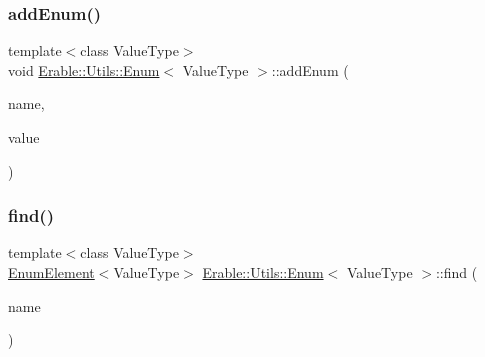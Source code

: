 \mbox{\label{class_erable_1_1_utils_1_1_enum_a8ffb9f7e0977ecf7ae1dae1c9bf02cfb}} 
\subsubsection{\texorpdfstring{addEnum()}{addEnum()}\hspace{0.1cm}{\footnotesize\ttfamily [2/2]}}
{\footnotesize\ttfamily template$<$class Value\+Type$>$ \\
void \mbox{\hyperlink{class_erable_1_1_utils_1_1_enum}{Erable\+::\+Utils\+::\+Enum}}$<$ Value\+Type $>$\+::add\+Enum (\begin{DoxyParamCaption}\item[{const std\+::string \&}]{name,  }\item[{\mbox{\hyperlink{struct_erable_1_1_utils_1_1_enum_element}{Enum\+Element}}$<$ Value\+Type $>$}]{value }\end{DoxyParamCaption})\hspace{0.3cm}{\ttfamily [inline]}}

\mbox{\label{class_erable_1_1_utils_1_1_enum_af71a4e37d4b83486bfd66babcbee038b}} 
\subsubsection{\texorpdfstring{find()}{find()}\hspace{0.1cm}{\footnotesize\ttfamily [1/2]}}
{\footnotesize\ttfamily template$<$class Value\+Type$>$ \\
\mbox{\hyperlink{struct_erable_1_1_utils_1_1_enum_element}{Enum\+Element}}$<$Value\+Type$>$ \mbox{\hyperlink{class_erable_1_1_utils_1_1_enum}{Erable\+::\+Utils\+::\+Enum}}$<$ Value\+Type $>$\+::find (\begin{DoxyParamCaption}\item[{std\+::string}]{name }\end{DoxyParamCaption})\hspace{0.3cm}{\ttfamily [inline]}}

